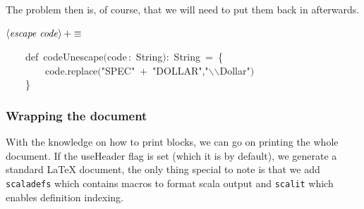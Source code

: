 \documentclass[a4paper,12pt]{article}
\begin{document}
The problem then is, of course, that we will need to put them back in
afterwards.

$\left<\mbox{\emph{escape code}}\right>+\equiv$
\begin{program}~~~~{\vem def}~codeUnescape$($code\,{\rm :}~String$)${\rm :}~String~=~{\small\{}
\\~~~~~~~~code.replace$($"SPEC"~$+$~"DOLLAR","$\backslash$$\backslash$Dollar"$)$
\\~~~~{\small\}}
\\[0.5em]\end{program}



\subsubsection{Wrapping the document}
With the knowledge on how to print blocks, we can go on printing the
whole document. If the useHeader flag is set (which it is by default),
we generate a standard LaTeX document, the only thing
special to note is that we add \texttt{scaladefs} which contains macros to
format scala output and \texttt{scalit} which enables definition indexing.
\end{document}

